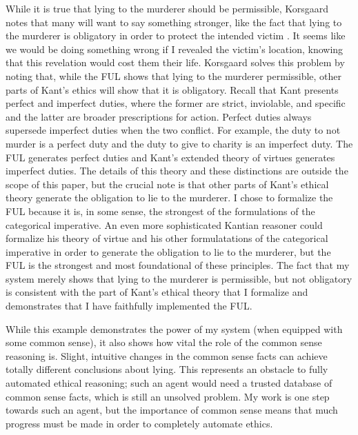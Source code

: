 \begin{isabellebody}
\begin{isamarkuptext}
While it is true that lying to the murderer should be permissible, Korsgaard notes that many will want
to say something stronger, like the fact that lying to the murderer is obligatory in order to protect
the intended victim \citep[15]{KorsgaardRTL}. It seems like we would be doing something wrong if I revealed the victim's
location, knowing that this revelation would cost them their life. Korsgaard solves this problem by 
noting that, while the FUL shows that lying to the murderer permissible, other parts of Kant's ethics
will show that it is obligatory. Recall that Kant presents perfect and imperfect duties,
where the former are strict, inviolable, and specific and the latter are broader prescriptions for action.
Perfect duties always supersede imperfect duties when the two conflict.
For example, the duty to not murder is a perfect duty and the duty to give to charity is an imperfect duty. 
The FUL generates perfect duties and Kant's extended theory of virtues generates imperfect duties. The details
of this theory and these distinctions are outside the scope of this paper, but the crucial note is that 
other parts of Kant's ethical theory generate the obligation to lie to the murderer. I chose
to formalize the FUL because it is, in some sense, the strongest of the formulations of the categorical
imperative. An even more sophisticated Kantian reasoner could formalize his theory of virtue and his
other formulatations of the categorical imperative in order to generate the obligation to lie to the murderer, 
but the FUL is the strongest and most foundational of these principles. The fact that my system merely
shows that lying to the murderer is permissible, but not obligatory is consistent with the part of 
Kant's ethical theory that I formalize and demonstrates that I have faithfully implemented the FUL.%
\end{isamarkuptext}\isamarkuptrue%
%
\begin{isamarkuptext}%
While this example demonstrates the power of my system (when equipped with some common sense), it 
also shows how vital the role of the common sense reasoning is. Slight, intuitive changes in the common
sense facts can achieve totally different conclusions about lying. This represents an obstacle to 
fully automated ethical reasoning; such an agent would need a trusted database of common 
sense facts, which is still an unsolved problem. My work is one step towards such an agent, but the 
importance of common sense means that much progress must be made in order to completely automate ethics.


\end{isamarkuptext}
\end{isabellebody}
